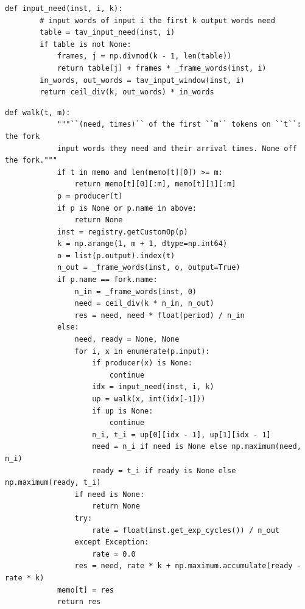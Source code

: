 \documentclass[10pt,a4paper]{article}
\begin{document}
\begin{lstlisting}[firstnumber=1074,title={\texttt{src/finn/transformation/fpgadataflow/derive\_characteristic.py}, lines 1074--1081}]
    def input_need(inst, i, k):
        # input words of input i the first k output words need
        table = tav_input_need(inst, i)
        if table is not None:
            frames, j = np.divmod(k - 1, len(table))
            return table[j] + frames * _frame_words(inst, i)
        in_words, out_words = tav_input_window(inst, i)
        return ceil_div(k, out_words) * in_words
\end{lstlisting}
\begin{lstlisting}[firstnumber=1097,title={\texttt{src/finn/transformation/fpgadataflow/derive\_characteristic.py}, lines 1097--1162}]
        def walk(t, m):
            """``(need, times)`` of the first ``m`` tokens on ``t``: the fork
            input words they need and their arrival times. None off the fork."""
            if t in memo and len(memo[t][0]) >= m:
                return memo[t][0][:m], memo[t][1][:m]
            p = producer(t)
            if p is None or p.name in above:
                return None
            inst = registry.getCustomOp(p)
            k = np.arange(1, m + 1, dtype=np.int64)
            o = list(p.output).index(t)
            n_out = _frame_words(inst, o, output=True)
            if p.name == fork.name:
                n_in = _frame_words(inst, 0)
                need = ceil_div(k * n_in, n_out)
                res = need, need * float(period) / n_in
            else:
                need, ready = None, None
                for i, x in enumerate(p.input):
                    if producer(x) is None:
                        continue
                    idx = input_need(inst, i, k)
                    up = walk(x, int(idx[-1]))
                    if up is None:
                        continue
                    n_i, t_i = up[0][idx - 1], up[1][idx - 1]
                    need = n_i if need is None else np.maximum(need, n_i)
                    ready = t_i if ready is None else np.maximum(ready, t_i)
                if need is None:
                    return None
                try:
                    rate = float(inst.get_exp_cycles()) / n_out
                except Exception:
                    rate = 0.0
                res = need, rate * k + np.maximum.accumulate(ready - rate * k)
            memo[t] = res
            return res


\end{lstlisting}
\end{document}
